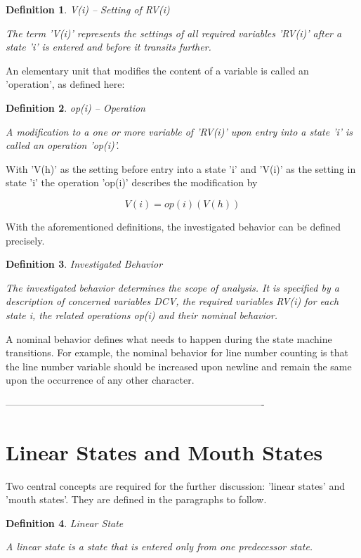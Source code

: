 \documentclass[12pt]{article}
\newtheorem{definition}{Definition}
\begin{document}
\begin{definition}
V(i) -- Setting of RV(i)

The term 'V(i)' represents the settings of all required variables 'RV(i)'
after a state 'i' is entered and before it transits further. 
\end{definition}
    
An elementary unit that modifies the content of a variable is called an
'operation', as defined here:

\begin{definition}
op(i) -- Operation 

A modification to a one or more variable of 'RV(i)' upon entry into a state
'i' is called an operation 'op(i)'. 
\end{definition}
    
With 'V(h)' as the setting before entry into a state 'i' and 'V(i)' as the
setting in state 'i' the operation 'op(i)' describes the modification by 

\[
                         V(i) = op(i)(V(h))
\]

With the aforementioned definitions, the investigated behavior can be defined
precisely.

\begin{definition}
Investigated Behavior 

The investigated behavior determines the scope of analysis. It is
specified by a description of concerned variables DCV, the required
variables RV(i) for each state i, the related operations op(i) and
their nominal behavior.
\end{definition}
    
A nominal behavior defines what needs to happen during the state machine
transitions.  For example, the nominal behavior for line number counting is
that the line number variable should be increased upon newline and remain the
same upon the occurrence of any other character. 

-------------------------------------------------------------------------------

\section{Linear States and Mouth States}

Two central concepts are required for the further discussion: 'linear states' and 'mouth
states'.  They are defined in the paragraphs to follow. 

\begin{definition}
Linear State

A linear state is a state that is entered only from one predecessor state.
\end{definition}
\end{document}
